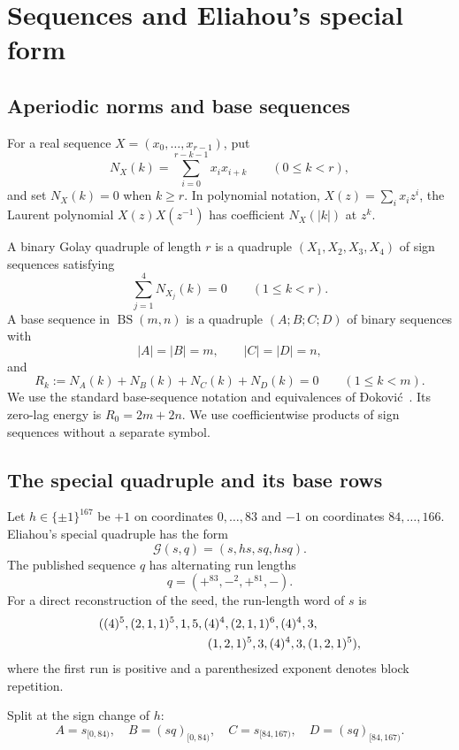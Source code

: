 \documentclass[11pt]{article}
\theoremstyle{remark}
\newcommand{\BS}{\operatorname{BS}}
\begin{document}
\section{Sequences and Eliahou's special form}

\subsection{Aperiodic norms and base sequences}

For a real sequence $X=(x_0,\ldots,x_{r-1})$, put
\[
 N_X(k)=\sum_{i=0}^{r-k-1}x_ix_{i+k}
 \qquad(0\leq k<r),
\]
and set $N_X(k)=0$ when $k\geq r$.  In polynomial notation,
$X(z)=\sum_i x_i z^i$, the Laurent polynomial
$X(z)X(z^{-1})$ has coefficient $N_X(|k|)$ at $z^k$.

A binary Golay quadruple of length $r$ is a quadruple
$(X_1,X_2,X_3,X_4)$ of sign sequences satisfying
\[
 \sum_{j=1}^4 N_{X_j}(k)=0
 \qquad(1\leq k<r).
\]
A base sequence in $\BS(m,n)$ is a quadruple $(A;B;C;D)$ of binary
sequences with
\[
 |A|=|B|=m,\qquad |C|=|D|=n,
\]
and
\[
 R_k:=N_A(k)+N_B(k)+N_C(k)+N_D(k)=0
 \qquad(1\leq k<m).
\]
We use the standard base-sequence notation and equivalences of
Đoković~\cite{djokovic-bs}.  Its zero-lag energy is $R_0=2m+2n$.
We use coefficientwise products of sign sequences without a separate
symbol.

\subsection{The special quadruple and its base rows}

Let $h\in\{\pm1\}^{167}$ be $+1$ on coordinates $0,\ldots,83$ and
$-1$ on coordinates $84,\ldots,166$.  Eliahou's special quadruple has
the form
\begin{equation}
 \mathcal G(s,q)=(s,hs,sq,hsq).                 \label{eq:special}
\end{equation}
The published sequence $q$ has alternating run lengths
\[
 q=(+^{83},-^2,+^{81},-).
\]
For a direct reconstruction of the seed, the run-length word of $s$ is
\begin{align*}
 &((4)^5,(2,1,1)^5,1,5,(4)^4,(2,1,1)^6,(4)^4,3,\\
 &\hspace{31mm}(1,2,1)^5,3,(4)^4,3,(1,2,1)^5),
\end{align*}
where the first run is positive and a parenthesized exponent denotes block
repetition.

Split at the sign change of $h$:
\begin{equation}
 A=s_{[0,84)},\quad B=(sq)_{[0,84)},\quad
 C=s_{[84,167)},\quad D=(sq)_{[84,167)}.       \label{eq:base-map}
\end{equation}
\end{document}
